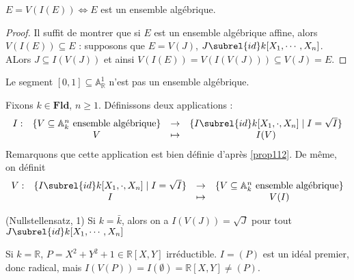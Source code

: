             \begin{lemm}
                $E = V(I(E)) \iff E$ est un ensemble algébrique. 
            \end{lemm}
            \begin{proof}
                Il suffit de montrer que si $E$ est un ensemble algébrique affine, alors \linebreak $V(I(E)) \subseteq E$ : supposons que $E = V(J)$, $J \subrel{id} k[X_1, \cdots, X_n]$. ALors $J \subseteq I(V(J))$ et ainsi $V(I(E)) = V(I(V(J))) \subseteq V(J) = E$.
            \end{proof}
            \begin{expl}
                Le segment $[0,1] \subseteq \mathbb{A}_\mathbb{R}^1$ n'est pas un ensemble algébrique.
            \end{expl}
            Fixons $k \in \mathbf{Fld}$, $n \geq 1$. Définissons deux applications :
            \begin{align*}
                \begin{array}{cccc}
                    I : & \{V \subseteq \mathbb{A}_k^n \text{ ensemble algébrique}\} & \to & \{I \subrel{id} k[X_1, \cdot, X_n] \mid I = \sqrt{I} \} \\
                    & V & \mapsto & I(V)\\
                \end{array}
            \end{align*}
            Remarquons que cette application est bien définie d'après \ref{prop112}. De même, on définit
            \begin{align*}
                \begin{array}{cccc}
                    V : & \{I \subrel{id} k[X_1, \cdot, X_n] \mid I = \sqrt{I} \} & \to & \{V \subseteq \mathbb{A}_k^n \text{ ensemble algébrique}\} \\
                    & I & \mapsto & V(I) \\
                \end{array}
            \end{align*}
            \begin{theo} (Nullstellensatz, 1)
                \label{Null_1}
                Si $k = \bar k$, alors on a $I(V(J)) = \sqrt{J}$ pour tout $J \subrel{id} k[X_1, \cdots, X_n]$
            \end{theo}
            \begin{expl}
                Si $k = \mathbb{R}$, $P = X^2 + Y^2 + 1 \in \mathbb{R}[X,Y]$ irréductible. $I = (P)$ est un idéal premier, donc radical, mais $I(V(P)) = I(\emptyset) = \mathbb{R}[X,Y] \neq (P)$.
            \end{expl}
